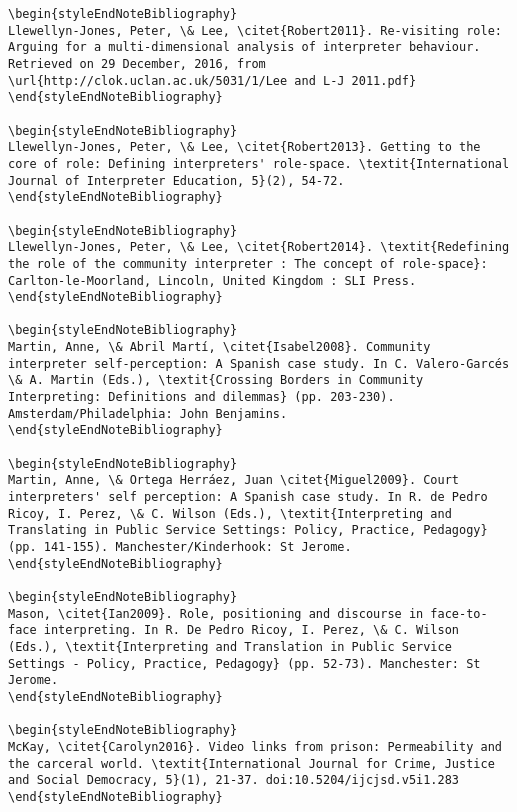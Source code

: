 \documentclass[output=paper]{langsci/langscibook}
\begin{document}
\begin{verbatim}
\begin{styleEndNoteBibliography}
Llewellyn-Jones, Peter, \& Lee, \citet{Robert2011}. Re-visiting role: Arguing for a multi-dimensional analysis of interpreter behaviour. Retrieved on 29 December, 2016, from \url{http://clok.uclan.ac.uk/5031/1/Lee and L-J 2011.pdf}
\end{styleEndNoteBibliography}

\begin{styleEndNoteBibliography}
Llewellyn-Jones, Peter, \& Lee, \citet{Robert2013}. Getting to the core of role: Defining interpreters' role-space. \textit{International Journal of Interpreter Education, 5}(2), 54-72. 
\end{styleEndNoteBibliography}

\begin{styleEndNoteBibliography}
Llewellyn-Jones, Peter, \& Lee, \citet{Robert2014}. \textit{Redefining the role of the community interpreter : The concept of role-space}: Carlton-le-Moorland, Lincoln, United Kingdom : SLI Press.
\end{styleEndNoteBibliography}

\begin{styleEndNoteBibliography}
Martin, Anne, \& Abril Martí, \citet{Isabel2008}. Community interpreter self-perception: A Spanish case study. In C. Valero-Garcés \& A. Martin (Eds.), \textit{Crossing Borders in Community Interpreting: Definitions and dilemmas} (pp. 203-230). Amsterdam/Philadelphia: John Benjamins.
\end{styleEndNoteBibliography}

\begin{styleEndNoteBibliography}
Martin, Anne, \& Ortega Herráez, Juan \citet{Miguel2009}. Court interpreters' self perception: A Spanish case study. In R. de Pedro Ricoy, I. Perez, \& C. Wilson (Eds.), \textit{Interpreting and Translating in Public Service Settings: Policy, Practice, Pedagogy} (pp. 141-155). Manchester/Kinderhook: St Jerome.
\end{styleEndNoteBibliography}

\begin{styleEndNoteBibliography}
Mason, \citet{Ian2009}. Role, positioning and discourse in face-to-face interpreting. In R. De Pedro Ricoy, I. Perez, \& C. Wilson (Eds.), \textit{Interpreting and Translation in Public Service Settings - Policy, Practice, Pedagogy} (pp. 52-73). Manchester: St Jerome.
\end{styleEndNoteBibliography}

\begin{styleEndNoteBibliography}
McKay, \citet{Carolyn2016}. Video links from prison: Permeability and the carceral world. \textit{International Journal for Crime, Justice and Social Democracy, 5}(1), 21-37. doi:10.5204/ijcjsd.v5i1.283
\end{styleEndNoteBibliography}


\end{verbatim}
\end{document}
